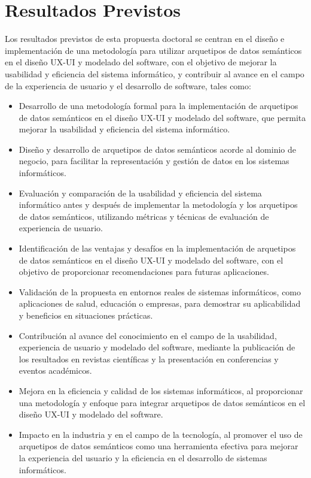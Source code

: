 \documentclass[12pt,a4paper]{article}
\begin{document}
\section{Resultados Previstos}
Los resultados previstos de esta propuesta doctoral se centran en el diseño e implementación de una metodología para utilizar arquetipos de datos semánticos en el diseño UX-UI y modelado del software, con el objetivo de mejorar la usabilidad y eficiencia del sistema informático, y contribuir al avance en el campo de la experiencia de usuario y el desarrollo de software, tales como:

\begin{itemize}
  \item Desarrollo de una metodología formal para la implementación de arquetipos de datos semánticos en el diseño UX-UI y modelado del software, que permita mejorar la usabilidad y eficiencia del sistema informático.
  
  \item Diseño y desarrollo de arquetipos de datos semánticos acorde al dominio de negocio, para facilitar la representación y gestión de datos en los sistemas informáticos.
  
  \item Evaluación y comparación de la usabilidad y eficiencia del sistema informático antes y después de implementar la metodología y los arquetipos de datos semánticos, utilizando métricas y técnicas de evaluación de experiencia de usuario.
  
  \item Identificación de las ventajas y desafíos en la implementación de arquetipos de datos semánticos en el diseño UX-UI y modelado del software, con el objetivo de proporcionar recomendaciones para futuras aplicaciones.
  
  \item Validación de la propuesta en entornos reales de sistemas informáticos, como aplicaciones de salud, educación o empresas, para demostrar su aplicabilidad y beneficios en situaciones prácticas.
  
  \item Contribución al avance del conocimiento en el campo de la usabilidad, experiencia de usuario y modelado del software, mediante la publicación de los resultados en revistas científicas y la presentación en conferencias y eventos académicos.
  
  \item Mejora en la eficiencia y calidad de los sistemas informáticos, al proporcionar una metodología y enfoque para integrar arquetipos de datos semánticos en el diseño UX-UI y modelado del software.
  
  \item Impacto en la industria y en el campo de la tecnología, al promover el uso de arquetipos de datos semánticos como una herramienta efectiva para mejorar la experiencia del usuario y la eficiencia en el desarrollo de sistemas informáticos.
\end{itemize}
\end{document}
